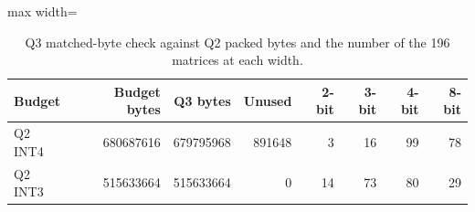 \begin{table}[!htb]
\centering
\scriptsize
\setlength{\tabcolsep}{3.5pt}
\caption{Q3 matched-byte check against Q2 packed bytes and the number of the 196 matrices at each width.}
\label{tab:t1q3budget}
\begin{adjustbox}{max width=\linewidth}
\begin{tabular}{lrrrrrrr}
\toprule
Budget & Budget bytes & Q3 bytes & Unused & 2-bit & 3-bit & 4-bit & 8-bit \\
\midrule
Q2 INT4 & 680687616 & 679795968 & 891648 & 3 & 16 & 99 & 78 \\
Q2 INT3 & 515633664 & 515633664 & 0 & 14 & 73 & 80 & 29 \\
\bottomrule
\end{tabular}
\end{adjustbox}
\end{table}
